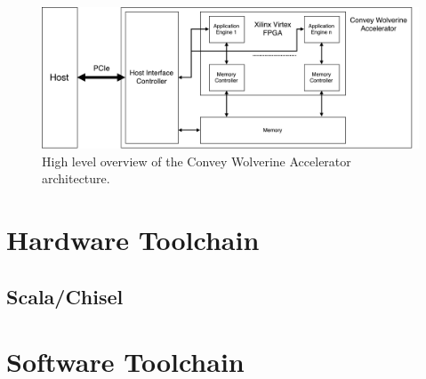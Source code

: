 \begin{figure}[ht]
  \centering
  \includegraphics[width=\linewidth]{fig/convey-wx-card}
  \caption{
    High level overview of the Convey Wolverine Accelerator architecture.
    \label{fig:convey-wx-card}
  }
\end{figure}


\section{Hardware Toolchain}


\subsection{Scala/Chisel}

\section{Software Toolchain}


\cleardoublepage
